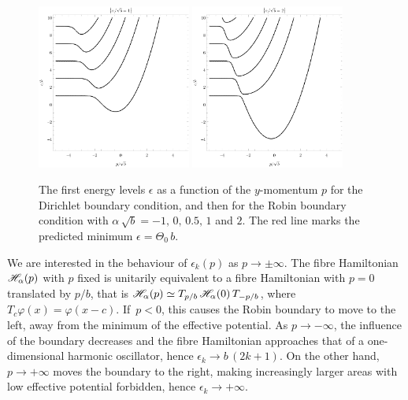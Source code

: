 \begin{figure}[p]
    \\[1em]%
    \includegraphics[width=0.45\textwidth]{grafy/robin1.pdf}%
    \hspace{0.1\textwidth}%
    \includegraphics[width=0.45\textwidth]{grafy/robin2.pdf}\par
    \caption{The first energy levels $\epsilon$ as a function of the $y$-momentum $p$ for the Dirichlet boundary condition, and then for the Robin boundary condition with $\alpha\,\sqrt{b} = -1, \, 0, \, 0.5, \, 1$ and $2$. The red line marks the predicted minimum $\epsilon = \Theta_0 \, b$.}
    \label{plots-robin}
\end{figure}

We are interested in the behaviour of $\epsilon_k(p)$ as $p \to \pm \infty$. The fibre Hamiltonian $\mathscr{H}_\alpha(p)$ with $p$ fixed is unitarily equivalent to a fibre Hamiltonian with $p=0$ translated by $p/b$, that is $\mathscr{H}_\alpha(p) \simeq T_{p/b} \, \mathscr{H}_\alpha(0) \, T_{-p/b}$, where $T_c \varphi(x) = {\varphi(x - c)}$. If~$p < 0$, this causes the Robin boundary to move to the left, away from the minimum of the effective potential. As $p \to -\infty$, the influence of the boundary decreases and the fibre Hamiltonian approaches that of a one-dimensional harmonic oscillator, hence $\epsilon_k \to b \, (2k+1)$. On the other hand, $p \to +\infty$ moves the boundary to the right, making increasingly larger areas with low effective potential forbidden, hence $\epsilon_k \to +\infty$.

